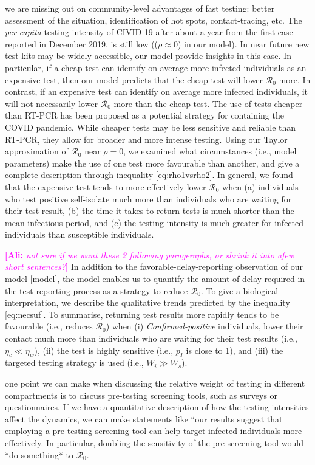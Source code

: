 \documentclass[12pt]{article}
\newcommand{\percap}{\emph{per capita}\xspace}
\newcommand{\Rnum}{\mathcal{R}_0}
\newcommand{\comment}{\showcomment}
\newcommand{\showcomment}[3]{\textcolor{#1}{\textbf{[#2: }\textsl{#3}\textbf{]}}}
\newcommand{\ali}[1]{\comment{magenta}{Ali}{#1}}
\theoremstyle{definition} %
\begin{document}
we are missing out on
community-level advantages of fast testing: better assessment of the
situation, identification of hot spots, contact-tracing, etc.
The \percap testing intensity of CIVID-19 after about a year from the first case reported in December 2019, is still low (($\rho \approx 0$) in our model). In near future new test kits may be widely accessible, our model provide insights in this case. 
In particular, if a cheap test can identify on average more infected individuals as an expensive test, then our model predicts that the cheap test will lower $\Rnum$ more. In contrast, if an expensive test can identify on average more infected individuals, it will not necessarily lower $\Rnum$ more than the cheap test. The use of tests cheaper than RT-PCR has been proposed as a potential strategy for containing the COVID pandemic. While cheaper tests may be less sensitive and reliable than RT-PCR, they allow for broader and more intense testing. Using our Taylor approximation of $\Rnum$ near $\rho = 0$, we examined what circumstances (i.e., model parameters) make the use of one test more favourable than another, and give a complete description through inequality \ref{eq:rho1vsrho2}. In general, we found that the expensive test tends to more effectively lower $\Rnum$ when (a) individuals who test positive self-isolate much more than individuals who are waiting for their test result, (b) the time it takes to return tests is much shorter than the mean infectious period, and (c) the testing intensity is much greater for infected individuals than susceptible individuals.

\ali{ not sure if we want these 2 following parageraphs, or shrink it into afew short sentences?}
In addition to the favorable-delay-reporting observation of our model \eqref{model}, the model enables us to quantify the amount of delay required in the test reporting process as a strategy to reduce $\Rnum$.
To give a biological interpretation, we describe the qualitative trends predicted by the inequality \eqref{eq:necsuf}. To summarise, returning test results more rapidly tends to be favourable (i.e., reduces $\Rnum$) when (i) \emph{Confirmed-positive} individuals, lower their contact much more than individuals who are waiting for their test results (i.e., $\eta_c \ll \eta_w$), (ii) the test is highly sensitive (i.e., $p_I$ is close to 1), and (iii) the targeted testing strategy is used (i.e., $W_i \gg W_s$). 

one point we can make when discussing the relative weight of testing in different compartments is to discuss pre-testing screening tools, such as surveys or questionnaires. If we have a quantitative description of how the testing intensities affect the dynamics, we can make statements like ``our results suggest that employing a pre-testing screening tool can help target infected individuals more effectively. In particular, doubling the sensitivity of the pre-screening tool would *do something* to $\Rnum$.
\end{document}

